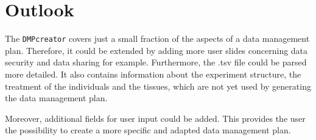 \section{Outlook}

The \texttt{DMPcreator} covers just a small fraction of the aspects of a data management plan. Therefore, it could be extended by adding more user slides concerning data security and data sharing for example. Furthermore, the .tsv file could be parsed more detailed. It also contains information about the experiment structure, the treatment of the individuals and the tissues, which are not yet used by generating the data management plan. 


Moreover, additional fields for user input could be added. This provides the user the possibility to create a more specific and adapted data management plan. 
